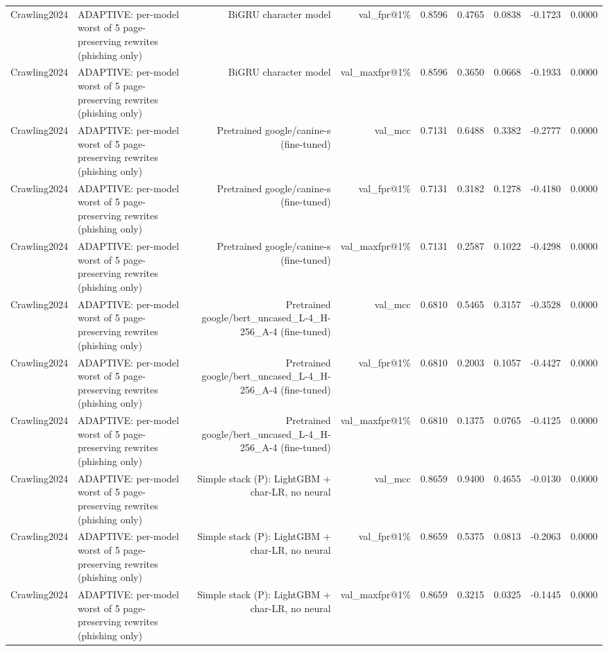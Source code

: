 \begin{table}[t]
\begin{tabular}{llrrrrrrr}
Crawling2024 & ADAPTIVE: per-model worst of 5 page-preserving rewrites (phishing only) & BiGRU character model & val\_fpr@1\% & 0.8596 & 0.4765 & 0.0838 & -0.1723 & 0.0000 \\
Crawling2024 & ADAPTIVE: per-model worst of 5 page-preserving rewrites (phishing only) & BiGRU character model & val\_maxfpr@1\% & 0.8596 & 0.3650 & 0.0668 & -0.1933 & 0.0000 \\
Crawling2024 & ADAPTIVE: per-model worst of 5 page-preserving rewrites (phishing only) & Pretrained google/canine-s (fine-tuned) & val\_mcc & 0.7131 & 0.6488 & 0.3382 & -0.2777 & 0.0000 \\
Crawling2024 & ADAPTIVE: per-model worst of 5 page-preserving rewrites (phishing only) & Pretrained google/canine-s (fine-tuned) & val\_fpr@1\% & 0.7131 & 0.3182 & 0.1278 & -0.4180 & 0.0000 \\
Crawling2024 & ADAPTIVE: per-model worst of 5 page-preserving rewrites (phishing only) & Pretrained google/canine-s (fine-tuned) & val\_maxfpr@1\% & 0.7131 & 0.2587 & 0.1022 & -0.4298 & 0.0000 \\
Crawling2024 & ADAPTIVE: per-model worst of 5 page-preserving rewrites (phishing only) & Pretrained google/bert\_uncased\_L-4\_H-256\_A-4 (fine-tuned) & val\_mcc & 0.6810 & 0.5465 & 0.3157 & -0.3528 & 0.0000 \\
Crawling2024 & ADAPTIVE: per-model worst of 5 page-preserving rewrites (phishing only) & Pretrained google/bert\_uncased\_L-4\_H-256\_A-4 (fine-tuned) & val\_fpr@1\% & 0.6810 & 0.2003 & 0.1057 & -0.4427 & 0.0000 \\
Crawling2024 & ADAPTIVE: per-model worst of 5 page-preserving rewrites (phishing only) & Pretrained google/bert\_uncased\_L-4\_H-256\_A-4 (fine-tuned) & val\_maxfpr@1\% & 0.6810 & 0.1375 & 0.0765 & -0.4125 & 0.0000 \\
Crawling2024 & ADAPTIVE: per-model worst of 5 page-preserving rewrites (phishing only) & Simple stack (P): LightGBM + char-LR, no neural & val\_mcc & 0.8659 & 0.9400 & 0.4655 & -0.0130 & 0.0000 \\
Crawling2024 & ADAPTIVE: per-model worst of 5 page-preserving rewrites (phishing only) & Simple stack (P): LightGBM + char-LR, no neural & val\_fpr@1\% & 0.8659 & 0.5375 & 0.0813 & -0.2063 & 0.0000 \\
Crawling2024 & ADAPTIVE: per-model worst of 5 page-preserving rewrites (phishing only) & Simple stack (P): LightGBM + char-LR, no neural & val\_maxfpr@1\% & 0.8659 & 0.3215 & 0.0325 & -0.1445 & 0.0000 \\
\bottomrule
\end{tabular}
\end{table}